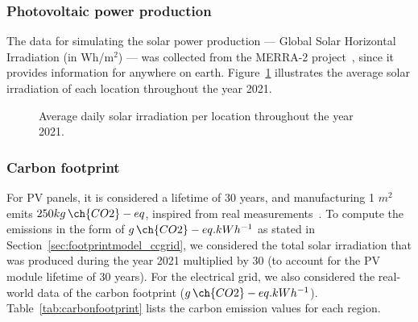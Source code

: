 \subsubsection{Photovoltaic power production}

The data for simulating the solar power production --- Global Solar Horizontal Irradiation (in Wh/m$^{2}$) --- was collected from the MERRA-2 project~\cite{GELARO2017MERRA2}, since it provides information for anywhere on earth. Figure~\ref{fig:pv_ghi} illustrates the average solar irradiation of each location throughout the year 2021.

 \begin{figure}[!htbp]
  \centering
   {}
  \caption{Average daily solar irradiation per location throughout the year 2021.}
  \label{fig:pv_ghi}
\end{figure}

\subsubsection{Carbon footprint}

For PV panels, it is considered a lifetime of 30 years, and manufacturing 1 $m^2$ emits $250 kg\,\ch{CO2}-eq$, inspired from real measurements~\cite{YUE2014pv_carbon}. To compute the emissions in the form of $g\,\ch{CO2}-eq.kWh^{-1}$ as stated in Section~\ref{sec:footprintmodel_ccgrid}, we considered the total solar irradiation that was produced during the year 2021 multiplied by 30 (to account for the PV module lifetime of 30 years). For the electrical grid, we also considered the real-world data of the carbon footprint ($g\,\ch{CO2}-eq.kWh^{-1}$). Table~\ref{tab:carbonfootprint} lists the carbon emission values for each region.

